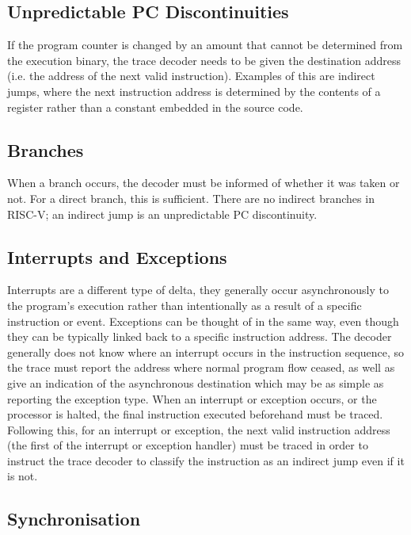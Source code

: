 \subsection{Unpredictable PC Discontinuities} \label{unpredpc}

If the program counter is changed by an amount that cannot be
determined from the execution binary, the trace decoder needs to be
given the destination address (i.e. the address of the next valid
instruction).  Examples of this are indirect jumps, where
the next instruction address is determined by the contents of a
register rather than a constant embedded in the source code.

\subsection{Branches} \label{branches}

When a branch occurs, the decoder must be informed of whether it was
taken or not.  For a direct branch, this is sufficient.  There are no
indirect branches in RISC-V; an indirect jump is an unpredictable PC
discontinuity.

\subsection{Interrupts and Exceptions} \label{interruptsexceptions}

Interrupts are a different type of delta, they generally occur
asynchronously to the program's execution rather than intentionally as
a result of a specific instruction or event. Exceptions can be thought
of in the same way, even though they can be typically linked back to a
specific instruction address.  The decoder generally does not know
where an interrupt occurs in the instruction sequence, so the trace
must report the address where normal program flow ceased, as well as
give an indication of the asynchronous destination which may be as
simple as reporting the exception type.  When an interrupt or
exception occurs, or the processor is halted, the final instruction
executed beforehand must be traced.  Following this, for an interrupt
or exception, the next valid instruction address (the first of the
interrupt or exception handler) must be traced in order to instruct the
trace decoder to classify the instruction as an indirect jump even
if it is not.

\subsection{Synchronisation} \label{synchronisation}

